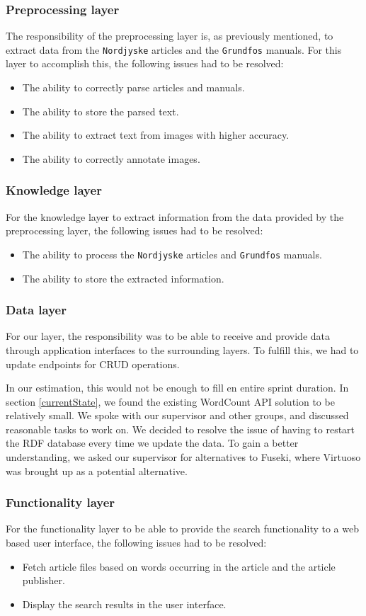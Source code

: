 \subsubsection*{Preprocessing layer}
The responsibility of the preprocessing layer is, as previously mentioned, to extract data from the \texttt{Nordjyske} articles and the \texttt{Grundfos} manuals. For this layer to accomplish this, the following issues had to be resolved:
\begin{itemize}
    \item The ability to correctly parse articles and manuals.
    \item The ability to store the parsed text.
    \item The ability to extract text from images with higher accuracy.
    \item The ability to correctly annotate images.
\end{itemize}

\subsubsection*{Knowledge layer}
For the knowledge layer to extract information from the data provided by the preprocessing layer, the following issues had to be resolved:
\begin{itemize}
    \item The ability to process the \texttt{Nordjyske} articles and \texttt{Grundfos} manuals.
    \item The ability to store the extracted information.
\end{itemize}

\subsubsection*{Data layer}
For our layer, the responsibility was to be able to receive and provide data through application interfaces to the surrounding layers.
To fulfill this, we had to update endpoints for CRUD operations.

In our estimation, this would not be enough to fill en entire sprint duration. In section \ref{currentState}, we found the existing WordCount API solution to be relatively small.
We spoke with our supervisor and other groups, and discussed reasonable tasks to work on. We decided to resolve the issue of having to restart the RDF database every time we update the data. To gain a better understanding, we asked our supervisor for alternatives to Fuseki, where Virtuoso was brought up as a potential alternative.

\subsubsection*{Functionality layer}
For the functionality layer to be able to provide the search functionality to a web based user interface, the following issues had to be resolved:
\begin{itemize}
    \item Fetch article files based on words occurring in the article and the article publisher.
    \item Display the search results in the user interface.
\end{itemize}